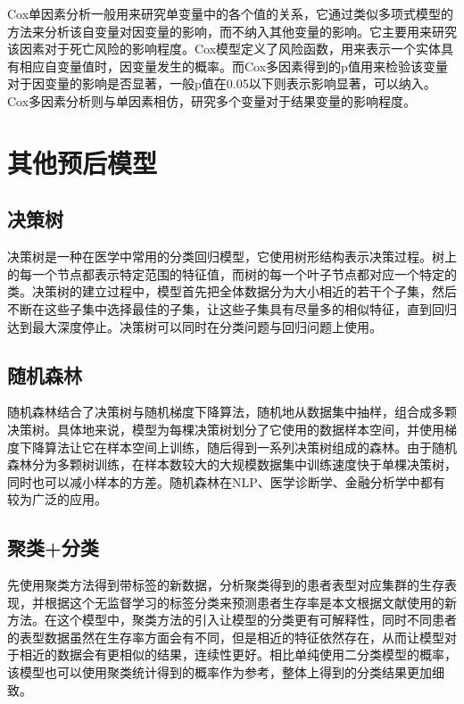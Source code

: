 Cox单因素分析一般用来研究单变量中的各个值的关系，它通过类似多项式模型的方法来分析该自变量对因变量的影响，而不纳入其他变量的影响。它主要用来研究该因素对于死亡风险的影响程度。Cox模型定义了风险函数，用来表示一个实体具有相应自变量值时，因变量发生的概率。而Cox多因素得到的p值用来检验该变量对于因变量的影响是否显著，一般p值在0.05以下则表示影响显著，可以纳入。Cox多因素分析则与单因素相仿，研究多个变量对于结果变量的影响程度。

\section{其他预后模型}

\subsection{决策树}

决策树是一种在医学中常用的分类回归模型，它使用树形结构表示决策过程。树上的每一个节点都表示特定范围的特征值，而树的每一个叶子节点都对应一个特定的类。决策树的建立过程中，模型首先把全体数据分为大小相近的若干个子集，然后不断在这些子集中选择最佳的子集，让这些子集具有尽量多的相似特征，直到回归达到最大深度停止。决策树可以同时在分类问题与回归问题上使用。

\subsection{随机森林}

随机森林结合了决策树与随机梯度下降算法，随机地从数据集中抽样，组合成多颗决策树。具体地来说，模型为每棵决策树划分了它使用的数据样本空间，并使用梯度下降算法让它在样本空间上训练，随后得到一系列决策树组成的森林。由于随机森林分为多颗树训练，在样本数较大的大规模数据集中训练速度快于单棵决策树，同时也可以减小样本的方差。随机森林在NLP、医学诊断学、金融分析学中都有较为广泛的应用。

\subsection{聚类+分类}

先使用聚类方法得到带标签的新数据，分析聚类得到的患者表型对应集群的生存表现，并根据这个无监督学习的标签分类来预测患者生存率是本文根据文献\cite{life12060776}使用的新方法。在这个模型中，聚类方法的引入让模型的分类更有可解释性，同时不同患者的表型数据虽然在生存率方面会有不同，但是相近的特征依然存在，从而让模型对于相近的数据会有更相似的结果，连续性更好。相比单纯使用二分类模型的概率，该模型也可以使用聚类统计得到的概率作为参考，整体上得到的分类结果更加细致。
